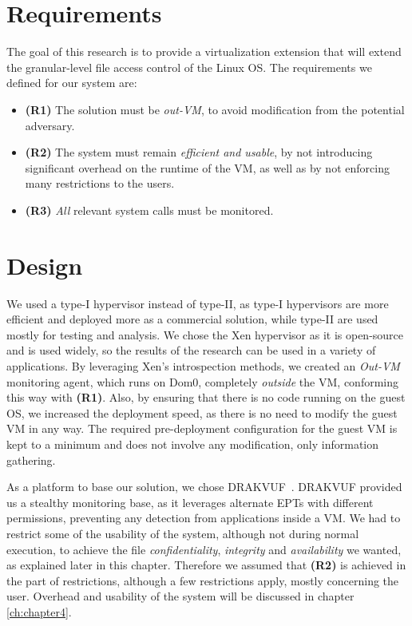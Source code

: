 \section{Requirements}\label{sec:requirements}
The goal of this research is to provide a virtualization extension that will extend the granular-level file access control of the Linux \ac{OS}. The requirements we defined for our system are:
\begin{itemize}
	\item \textbf{(R1)} The solution must be \emph{out-\ac{VM}}, to avoid modification from the potential adversary. 
	\item \textbf{(R2)} The system must remain \emph{efficient and usable}, by not introducing significant overhead on the runtime of the \ac{VM}, as well as by not enforcing many restrictions to the users. 
	\item \textbf{(R3)} \emph{All} relevant system calls must be monitored.
\end{itemize}


\section{Design}\label{sec:design}

\par We used a type-I hypervisor instead of type-II, as type-I hypervisors are more efficient and deployed more as a commercial solution, while type-II are used mostly for testing and analysis. We chose the Xen hypervisor as it is open-source and is used widely, so the results of the research can be used in a variety of applications. By leveraging Xen's introspection methods, we created an \emph{Out-VM} monitoring agent, which runs on Dom0, completely \emph{outside} the \ac{VM}, conforming this way with \textbf{(R1)}. Also, by ensuring that there is no code running on the guest \ac{OS}, we increased the deployment speed, as there is no need to modify the guest \ac{VM} in any way. The required pre-deployment configuration for the guest \ac{VM} is kept to a minimum and does not involve any modification, only information gathering.

\par As a platform to base our solution, we chose DRAKVUF~\cite{lengyel2014drakvuf}. DRAKVUF provided us a stealthy monitoring base, as it leverages alternate \ac{EPT}s with different permissions, preventing any detection from applications inside a \ac{VM}. We had to restrict some of the usability of the system, although not during normal execution, to achieve the file \emph{confidentiality}, \emph{integrity} and \emph{availability} we wanted, as explained later in this chapter. Therefore we assumed that \textbf{(R2)} is achieved in the part of restrictions, although a few restrictions apply, mostly concerning the  user. Overhead and usability of the system will be discussed in chapter \ref{ch:chapter4}.

